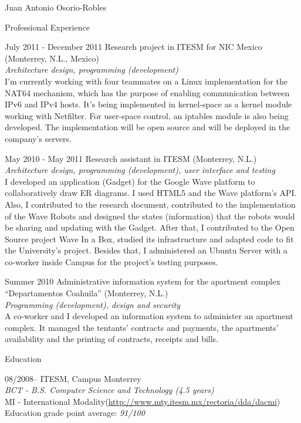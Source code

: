 \documentclass[spanish,10pt,letterpaper]{article}
\begin{document}
\begin{cv}{Juan Antonio Osorio-Robles}
	\begin{cvlist}{Professional Experience}
		\item [July 2011 - December 2011]
			Research project in ITESM for NIC Mexico (Monterrey, N.L., Mexico)
			\\ \emph{Architecture design, programming (development)}
			\\ I'm currently working with four teammates on a Linux implementation for the NAT64 mechanism, which has the purpose of enabling communication between IPv6 and IPv4 hosts. It's being implemented in kernel-space as a kernel module working with Netfilter. For user-space control, an iptables module is also being developed. The implementation will be open source and will be deployed in the company's servers.
		\item [May 2010 - May 2011]
			Research assistant in ITESM (Monterrey, N.L.)
			\\ \emph{Architecture design, programming (development), user interface and testing}
			\\ I developed an application (Gadget) for the Google Wave platform to collaboratively draw ER diagrams. I used HTML5 and the Wave platform's API. Also, I contributed to the research document, contributed to the implementation of the Wave Robots and designed the states (information) that the robots would be sharing and updating with the Gadget. After that, I contributed to the Open Source project Wave In a Box, studied its infrastructure and adapted code to fit the University's project. Besides that, I administered an Ubuntu Server with a co-worker inside Campus for the project's testing purposes.
		\item [Summer 2010]
			Administrative information system for the apartment complex ``Departamentos Coahuila'' (Monterrey, N.L.)
			\\ \emph{Programming (development), design and security}
			\\ A co-worker and I developed an information system to administer an apartment complex. It managed the tentants' contracts and payments, the apartments' availability and the printing of contracts, receipts and bills.
			
	\end{cvlist}

	\begin{cvlist}{Education}
		\item	[08/2008--]
				ITESM, Campus Monterrey
				\\
				\emph{BCT - B.S. Computer Science and Technology (4.5 years)}
				\\
				MI - International Modality(\href{http://www.mty.itesm.mx/rectoria/dda/dacmi}{http://www.mty.itesm.mx/rectoria/dda/dacmi})
				\\
				Education grade point average: \emph{91/100}
	\end{cvlist}


\end{cv}
\end{document}

